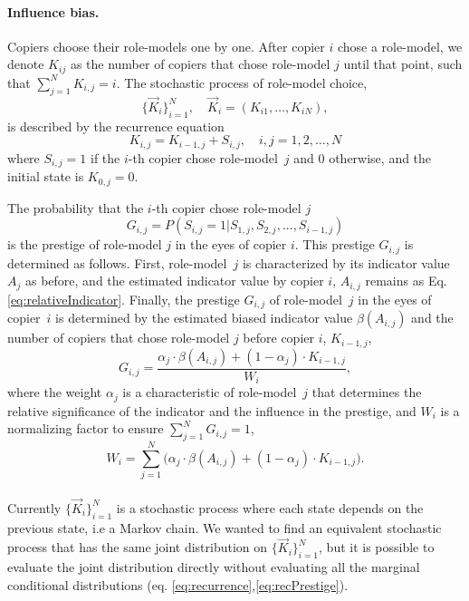 \documentclass[11pt]{article}
\begin{document}
\paragraph{Influence bias.}
Copiers choose their role-models one by one.
After copier $i$ chose a role-model, we denote $K_{ij}$ as the number of copiers that chose role-model $j$ until that point, such that $\sum_{j=1}^N{K_{i,j}} = i$. 
The stochastic process of role-model choice, 
\begin{equation} \label{eq:process}
\big\{\vec{K}_i\big\}_{i=1}^N, \quad \vec{K}_i=(K_{i1}, \ldots, K_{iN}),
\end{equation}
is described by the recurrence equation
\begin{equation} \label{eq:recurrence}
K_{i,j} = K_{i-1,j} + S_{i,j}, \quad i,j=1,2,\ldots,N
\end{equation}
where $S_{i,j}=1$ if the $i$-th copier chose role-model~$j$ and 0 otherwise, and the initial state is $K_{0,j}=0$.

The probability that the $i$-th copier chose role-model $j$
\begin{equation}\label{eq:recPrestige}
G_{i,j}=P(S_{i,j}=1| S_{1,j},S_{2,j},...,S_{i-1,j})
\end{equation}
is the prestige of role-model $j$ in the eyes of copier $i$.
This prestige $G_{i,j}$ is determined as follows.
First, role-model~$j$ is characterized by its indicator value $A_j$ as before, and the estimated indicator value by copier $i$, $A_{i,j}$ remains as Eq. \ref{eq:relativeIndicator}.
Finally, the prestige $G_{i,j}$ of role-model~$j$ in the eyes of copier~$i$ is determined by the estimated biased indicator value $\beta(A_{i,j})$ and the number of copiers that chose role-model $j$ before copier $i$, $K_{i-1,j}$, 
\begin{equation}\label{prestige_eq}
G_{i,j} = \frac{\alpha_j \cdot \beta(A_{i,j}) + (1-\alpha_j) \cdot K_{i-1,j}}{W_i},
\end{equation}
where the weight $\alpha_j$ is a characteristic of role-model~$j$ that determines the relative significance of the indicator and the influence in the prestige, and $W_i$ is a normalizing factor to ensure $\sum_{j=1}^N{G_{i,j}}=1$,
\begin{equation}
W_i = \sum_{j=1}^N{\Big(\alpha_j \cdot \beta(A_{i,j}) + (1-\alpha_j) \cdot K_{i-1,j}\Big)}.
\end{equation}
\\

Currently $\big\{\vec{K}_i\big\}_{i=1}^N$ is a stochastic process where each state depends on the previous state, i.e a Markov chain.
We wanted to find an equivalent stochastic process that has the same joint distribution on $\big\{\vec{K}_i\big\}_{i=1}^N$, but it is possible to evaluate the joint distribution directly without evaluating all the marginal conditional distributions (eq. \ref{eq:recurrence},\ref{eq:recPrestige}).
\end{document}
